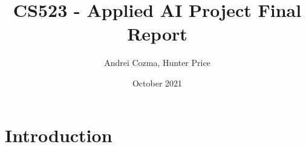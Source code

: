 \documentclass{article}
\title{CS523 - Applied AI Project Final Report}
\author{Andrei Cozma, Hunter Price}
\date{October 2021}
\begin{document}
\maketitle

\section{Introduction}
\end{document}
